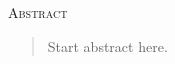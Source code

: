 \vspace*{\fill}

\begin{center}
    \textsc{Abstract}
\end{center}

\begin{quotation}
\noindent Start abstract here.

\end{quotation}
\vspace*{\fill}
